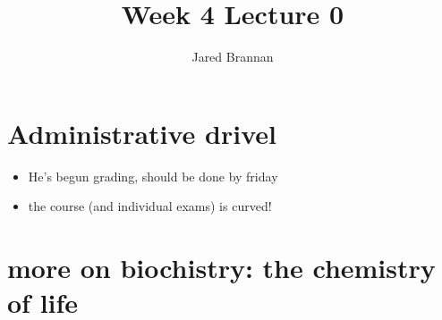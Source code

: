 \documentclass{article}
\title{Week 4 Lecture 0}
\author{Jared Brannan }
\theoremstyle{definition}
\begin{document}
\maketitle

\section{Administrative drivel}
\begin{itemize}
	\item He's begun grading, should be done by friday
	\item the course (and individual exams) is curved!
\end{itemize}

\section{more on biochistry: the chemistry of life}
\end{document}
